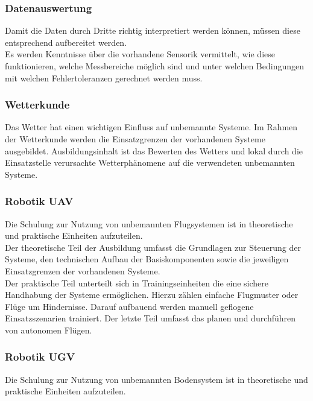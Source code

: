 \subsubsection{Datenauswertung}

Damit die Daten durch Dritte richtig interpretiert werden können, müssen diese entsprechend aufbereitet werden.\\

\noindent Es werden Kenntnisse über die vorhandene Sensorik vermittelt, wie diese funktionieren, welche Messbereiche möglich sind und unter welchen Bedingungen mit welchen Fehlertoleranzen gerechnet werden muss.

\subsubsection{Wetterkunde}

Das Wetter hat einen wichtigen Einfluss auf unbemannte Systeme. Im Rahmen der Wetterkunde werden die Einsatzgrenzen der vorhandenen Systeme ausgebildet. Ausbildungsinhalt ist das Bewerten des Wetters und lokal durch die Einsatzstelle verursachte Wetterphänomene auf die verwendeten unbemannten Systeme.

\subsubsection{Robotik UAV}

Die Schulung zur Nutzung von unbemannten Flugsystemen ist in theoretische und praktische Einheiten aufzuteilen.\\

\noindent Der theoretische Teil der Ausbildung umfasst die Grundlagen zur Steuerung der Systeme, den technischen Aufbau der Basiskomponenten sowie die jeweiligen Einsatzgrenzen der vorhandenen Systeme.\\

\noindent Der praktische Teil unterteilt sich in Trainingseinheiten die eine sichere Handhabung der Systeme ermöglichen. Hierzu zählen einfache Flugmuster oder Flüge um Hindernisse. Darauf aufbauend werden manuell geflogene Einsatzszenarien trainiert. Der letzte Teil umfasst das planen und durchführen von autonomen Flügen.

\subsubsection{Robotik UGV}

Die Schulung zur Nutzung von unbemannten Bodensystem ist in theoretische und praktische Einheiten aufzuteilen.\\

